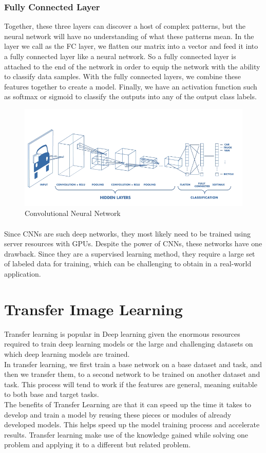 \subsubsection{Fully Connected Layer}
Together, these three layers can discover a host of complex patterns, but the neural network will
have no understanding of what these patterns mean. 
In the layer we call as the FC layer, we flatten our matrix into a vector and feed it into a fully connected layer like a neural network. So a fully connected layer is attached
to the end of the network in order to equip the network with the ability to classify data samples.
With the fully connected layers, we combine these features together to create a model. Finally, we have an activation function such as softmax or sigmoid to classify the outputs into any of the output class labels.
\begin{figure}[h]
	\label{ss}
	\centering
	\includegraphics[width= 16 cm]{CNN.png}
	\caption{Convolutional Neural Network}
\end{figure}
\paragraph{}
Since CNNs are such deep networks, they most likely need to be trained using
server resources with GPUs. Despite the power of CNNs, these networks have one drawback. Since they are a supervised
learning method, they require a large set of labeled data for training, which can be
challenging to obtain in a real-world application.

\section{Transfer Image Learning}
Transfer learning is popular in Deep learning given the enormous resources required to train deep learning models or the large and challenging datasets on which deep learning models are trained.\\
In transfer learning, we first train a base network on a base dataset and task, and then we transfer them, to a second network to be trained on another dataset and task. This process will tend to work if the features are general, meaning suitable to both base and target tasks.\\
The benefits of Transfer Learning are that it can speed up the time it takes to develop
and train a model by reusing these pieces or modules of already developed models. This
helps speed up the model training process and accelerate results.
Transfer learning make use of the knowledge gained while solving one problem and applying it to a different but related problem.
